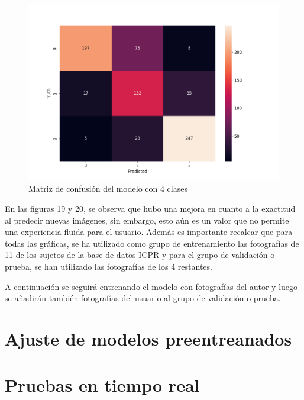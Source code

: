 \begin{figure}[H]
	\centering
	\includegraphics[scale=0.75]{figures/CM5.png}
	\caption{Matriz de confusión del modelo con 4 clases}
	\label{fig:img20}
\end{figure}

En las figuras 19 y  20, se observa que hubo una mejora en cuanto a la exactitud al predecir nuevas imágenes, sin embargo, esto aún es un valor que no permite una experiencia fluida para el usuario. Además es importante recalcar que para todas las gráficas, se ha utilizado como grupo de entrenamiento las fotografías de 11 de los sujetos de la base de datos ICPR y para el grupo de validación o prueba, se han utilizado las fotografías de los 4 restantes.\par

A continuación se seguirá entrenando el modelo con fotografías del autor y luego se añadirán también fotografías del usuario al grupo de validación o prueba.

\section{Ajuste de modelos preentreanados}
\section{Pruebas en tiempo real}

